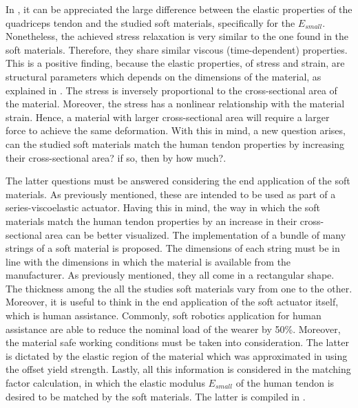 In , it can be appreciated the large difference between the elastic properties of the quadriceps tendon and the studied soft materials, specifically for the $E_{small}$. Nonetheless, the achieved stress relaxation is very similar to the one found in the soft materials. Therefore, they share similar viscous (time-dependent) properties. This is a positive finding, because the elastic properties, of stress and strain, are structural parameters which depends on the dimensions of the material, as explained in . The stress is inversely proportional to the cross-sectional area of the material. Moreover, the stress has a nonlinear relationship with the material strain. Hence, a material with larger cross-sectional area will require a larger force to achieve the same deformation. With this in mind, a new question arises, can the studied soft materials match the human tendon properties by increasing their cross-sectional area? if so, then by how much?.

The latter questions must be answered considering the end application of the soft materials. As previously mentioned, these are intended to be used as part of a series-viscoelastic actuator. Having this in mind, the way in which the soft materials match the human tendon properties by an increase in their cross-sectional area can be better visualized. The implementation of a bundle of many strings of a soft material is proposed. The dimensions of each string must be in line with the dimensions in which the material is available from the manufacturer. As previously mentioned, they all come in a rectangular shape. The thickness among the all the studies soft materials vary from one to the other. Moreover, it is useful to think in the end application of the soft actuator itself, which is human assistance. Commonly, soft robotics application for human assistance are able to reduce the nominal load of the wearer by 50\%. Moreover, the material safe working conditions must be taken into consideration. The latter is dictated by the elastic region of the material which was approximated in  using the offset yield strength. Lastly, all this information is considered in the matching factor calculation, in which the elastic modulus $E_{small}$ of the human tendon is desired to be matched by the soft materials. The latter is compiled in . 

